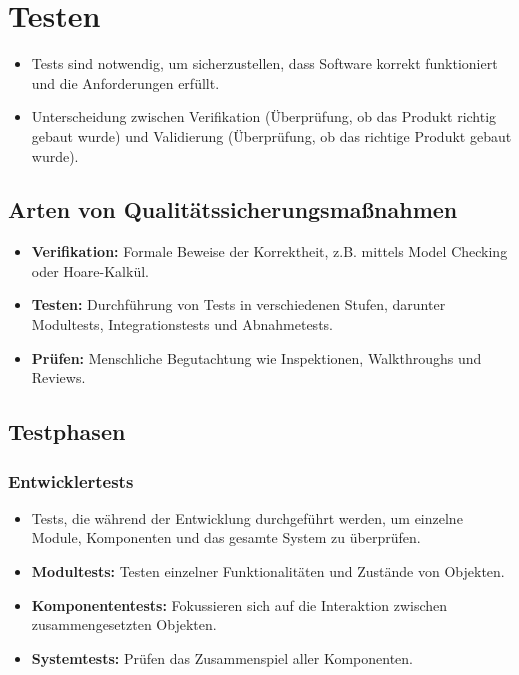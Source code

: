 \documentclass[11pt, a4paper]{article}
\begin{document}
\newpage
 

\section{Testen}

\begin{itemize}
    \item Tests sind notwendig, um sicherzustellen, dass Software korrekt funktioniert und die Anforderungen erfüllt.
    \item Unterscheidung zwischen Verifikation (Überprüfung, ob das Produkt richtig gebaut wurde) und Validierung (Überprüfung, ob das richtige Produkt gebaut wurde).
\end{itemize}

\subsection{Arten von Qualitätssicherungsmaßnahmen}
\begin{itemize}
    \item \textbf{Verifikation:} Formale Beweise der Korrektheit, z.B. mittels Model Checking oder Hoare-Kalkül.
    \item \textbf{Testen:} Durchführung von Tests in verschiedenen Stufen, darunter Modultests, Integrationstests und Abnahmetests.
    \item \textbf{Prüfen:} Menschliche Begutachtung wie Inspektionen, Walkthroughs und Reviews.
\end{itemize}

\subsection{Testphasen}

\subsubsection{Entwicklertests}
\begin{itemize}
    \item Tests, die während der Entwicklung durchgeführt werden, um einzelne Module, Komponenten und das gesamte System zu überprüfen.
    \item \textbf{Modultests:} Testen einzelner Funktionalitäten und Zustände von Objekten.
    \item \textbf{Komponententests:} Fokussieren sich auf die Interaktion zwischen zusammengesetzten Objekten.
    \item \textbf{Systemtests:} Prüfen das Zusammenspiel aller Komponenten.
\end{itemize}
\end{document}
